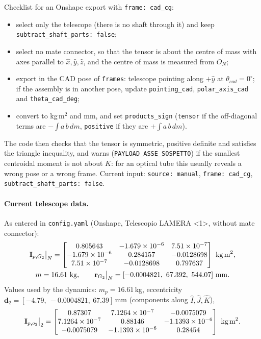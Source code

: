 \documentclass[10pt,a4paper]{article}
\numberwithin{equation}{section}
\begin{document}
Checklist for an Onshape export with \texttt{frame: cad\_cg}:
\begin{itemize}
\item select only the telescope (there is no shaft through it) and keep \texttt{subtract\_shaft\_parts: false};
\item select no mate connector, so that the tensor is about the centre of mass with axes parallel to $\hat x, \hat y, \hat z$, and the centre of mass is measured from $O_N$;
\item export in the CAD pose of \texttt{frames}: telescope pointing along $+\hat{y}$ at $\theta_{cad} = 0^\circ$; if the assembly is in another pose, update \texttt{pointing\_cad}, \texttt{polar\_axis\_cad} and \texttt{theta\_cad\_deg};
\item convert to kg\,m$^2$ and mm, and set \texttt{products\_sign} (\texttt{tensor} if the off-diagonal terms are $-\int a\,b\,dm$, \texttt{positive} if they are $+\int a\,b\,dm$).
\end{itemize}
The code then checks that the tensor is symmetric, positive definite and satisfies the triangle inequality, and warns (\texttt{PAYLOAD\_ASSE\_SOSPETTO}) if the smallest centroidal moment is not about $\hat K$: for an optical tube this usually reveals a wrong pose or a wrong frame. Current input: \texttt{source: manual}, \texttt{frame: cad\_cg}, \texttt{subtract\_shaft\_parts: false}.
\paragraph{Current telescope data.}
As entered in \texttt{config.yaml} (Onshape, Telescopio LAMERA <1>, without mate connector):
\begin{gather}\mathbf I_{p,G_2}\big|_N = \begin{bmatrix}0.805643 & -1.679\times10^{-6} & 7.51\times10^{-7} \\ -1.679\times10^{-6} & 0.284157 & -0.0128698 \\ 7.51\times10^{-7} & -0.0128698 & 0.797637\end{bmatrix}\ \text{kg\,m}^2, \\ m = 16.61\ \text{kg}, \qquad \mathbf r_{G_2}\big|_N = [-0.0004821,\ 67.392,\ 544.07]\ \text{mm}.\end{gather}
Values used by the dynamics: $m_p = 16.61$\,kg, eccentricity $\mathbf d_2 = [-4.79,\ -0.0004821,\ 67.39]$\,mm (components along $\hat I, \hat J, \hat K$),
\begin{gather}\mathbf I_{p,o_2}\big|_2 = \begin{bmatrix}0.87307 & 7.1264\times10^{-7} & -0.0075079 \\ 7.1264\times10^{-7} & 0.88146 & -1.1393\times10^{-6} \\ -0.0075079 & -1.1393\times10^{-6} & 0.28454\end{bmatrix}\ \text{kg\,m}^2 .\end{gather}
\end{document}
